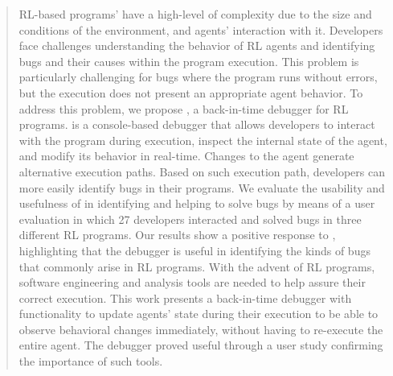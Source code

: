 \documentclass[a4paper,fleqn]{cas-sc}
\begin{document}
\begin{abstract}
\ac{RL}-based programs' have a high-level of complexity due to the size and 
conditions of the environment, and agents' interaction with it. Developers face challenges  
understanding the behavior of \ac{RL} agents and identifying bugs and their causes within the 
program execution. This problem is particularly challenging for bugs where the program runs 
without errors, but the execution does not present an appropriate agent behavior.
To address this problem, we propose \flik, a back-in-time debugger for \ac{RL} 
programs. \flik is a console-based debugger that allows developers to interact with 
the program during execution, inspect the internal state of the agent, and modify 
its behavior in real-time. Changes to the agent generate alternative execution paths. Based on such 
execution path, developers can more easily identify bugs in their programs.
We evaluate the usability and usefulness of \flik in identifying and helping to solve 
bugs by means of a user evaluation in which 27 developers interacted and solved bugs in three 
different \ac{RL}  programs. Our results show a positive response to \flik, highlighting that the 
debugger is useful in identifying the kinds of bugs that commonly arise in \ac{RL} programs. 
With the advent of \ac{RL} programs, software engineering and analysis tools are needed to help 
assure their correct execution. This work presents a back-in-time debugger with functionality to 
update agents' state during their execution to be able to observe behavioral changes immediately, 
without having to re-execute the entire agent. The debugger proved useful through a user study 
confirming the importance of such tools.
\end{abstract}


\end{document}
